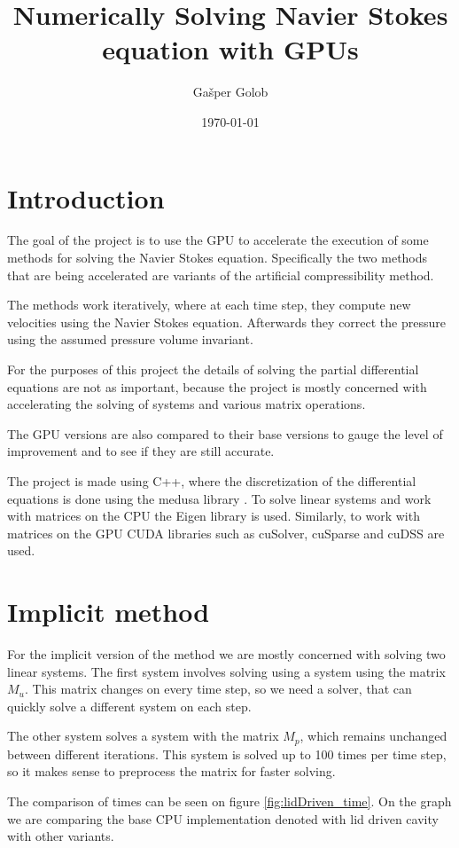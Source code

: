 \documentclass[12pt]{article}
\title{Numerically Solving Navier Stokes equation with GPUs}
\author{Gašper Golob}
\date{\today}
\begin{document}
\maketitle

\section{Introduction}
The goal of the project is to use the GPU to accelerate the execution of some methods for 
solving the Navier Stokes equation. Specifically the two methods that are being accelerated are 
variants of the artificial compressibility method.

The methods work iteratively, where at each time step, they compute new velocities using the 
Navier Stokes equation. Afterwards they correct the pressure using the assumed pressure volume 
invariant. 

For the purposes of this project the details of solving the partial differential equations are not 
as important, because the project is mostly concerned with accelerating the solving of systems and 
various matrix operations.

The GPU versions are also compared to their base versions to gauge the level of improvement and to 
see if they are still accurate.

The project is made using C++, where the discretization of the differential equations is done using 
the medusa library \cite{medusa}. To solve linear systems and work with matrices on the CPU the 
Eigen library is used. Similarly, to work with matrices on the GPU CUDA libraries such as
cuSolver, cuSparse and cuDSS are used.
\section{Implicit method}
For the implicit version of the method we are mostly concerned with solving two linear systems.
The first system involves solving using a system using the matrix \(M_u\). This matrix changes on 
every time step, so we need a solver, that can quickly solve a different system on each step.

The other system solves a system with the matrix \(M_p\), which remains unchanged between different 
iterations. This system is solved up to 100 times per time step, so it makes sense to preprocess the 
matrix for faster solving.

The comparison of times can be seen on figure \ref{fig:lidDriven_time}. On the graph we are comparing 
the base CPU implementation denoted with lid driven cavity with other variants.
\end{document}
